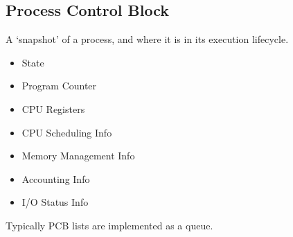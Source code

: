 \documentclass{article}
\begin{document}
\subsection*{Process Control Block}
A `snapshot' of a process, and where it is in its execution lifecycle.
\begin{itemize}
      \item State
      \item Program Counter
      \item CPU Registers
      \item CPU Scheduling Info
      \item Memory Management Info
      \item Accounting Info
      \item I/O Status Info
\end{itemize}

Typically PCB lists are implemented as a queue.
\end{document}
